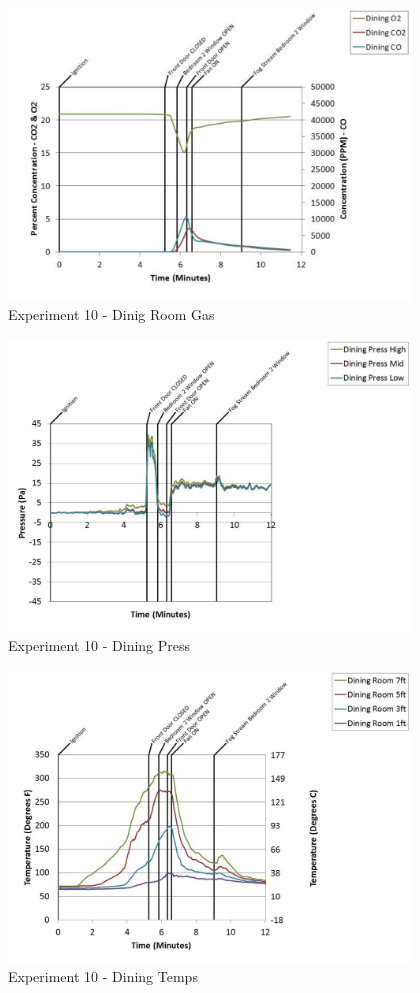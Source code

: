 \documentclass{article}
\begin{document}
\begin{appendices}
	\begin{figure}[h!]
		\centering
		\includegraphics[height=3.05in]{0_Images/Results_Charts/Exp_10_Charts/DinigRoomGas.pdf}
		\caption{Experiment 10 - Dinig Room Gas}
	\end{figure}
 
	\clearpage

	\begin{figure}[h!]
		\centering
		\includegraphics[height=3.05in]{0_Images/Results_Charts/Exp_10_Charts/DiningPress.pdf}
		\caption{Experiment 10 - Dining Press}
	\end{figure}
 

	\begin{figure}[h!]
		\centering
		\includegraphics[height=3.05in]{0_Images/Results_Charts/Exp_10_Charts/DiningTemps.pdf}
		\caption{Experiment 10 - Dining Temps}
	\end{figure}
 

\end{appendices}
\end{document}
